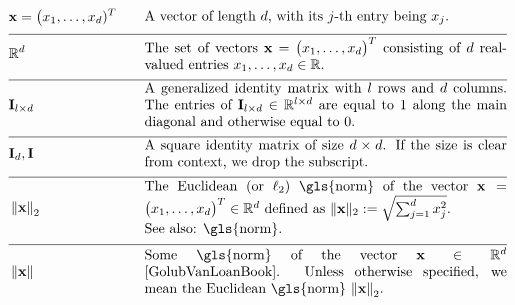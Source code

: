 \begin{align} 
	 &\featurevec=\big(\feature_{1}, \ldots, \feature_{\featuredim})^{T} &\quad & \parbox{.75\textwidth}{A vector of length $\featuredim$, with its 
		$\featureidx$-th entry being $\feature_{\featureidx}$.} \nonumber \\[2mm] \hline \nonumber\\[-5mm]
	&\mathbb{R}^{\featuredim} & \quad &  \parbox{.75\textwidth}{The set of vectors $\featurevec=\big(\feature_{1}, \ldots, \feature_{\featurelen}\big)^{T}$ consisting of 
		$\featuredim$ real-valued entries $\feature_{1}, \ldots, \feature_{\featurelen} \in \mathbb{R}$.} \nonumber \\[2mm] \hline \nonumber\\[-5mm]
	&\mathbf{I}_{\modelidx \times \featuredim}  & \quad &  \parbox{.75\textwidth}{A generalized identity matrix 
		with $\modelidx$ rows and $\featuredim$ columns. The entries of $\mathbf{I}_{\modelidx \times \featuredim} \in \mathbb{R}^{\modelidx \times \featuredim}$ 
		are equal to $1$ along the main diagonal and otherwise equal to $0$. }\nonumber \\[2mm] \hline \nonumber\\[-5mm] %
	&\mathbf{I}_{\dimlocalmodel}, \mathbf{I} & \quad &  \parbox{.75\textwidth}{A square identity 
		matrix of size $\dimlocalmodel \times \dimlocalmodel$. If the size is clear from 
		context, we drop the subscript.} \nonumber \\[2mm] \hline \nonumber\\[-5mm]
	&\normgeneric{\featurevec}{2}  &\quad & \parbox{.75\textwidth}{The Euclidean (or $\ell_{2}$) \gls{norm} of the vector 
		$\featurevec=\big(\feature_{1}, \ldots, \feature_{\featurelen}\big)^{T} \in \mathbb{R}^{\featuredim}$ defined as 
		$\| \featurevec \|_{2} \defeq \sqrt{\sum_{\featureidx=1}^{\featuredim} \feature_{\featureidx}^{2}}$.
		\\ See also: \gls{norm}. } \nonumber \\[2mm] \hline \nonumber\\[-5mm] 
	&\normgeneric{\featurevec}{}  & \quad &  \parbox{.75\textwidth}{Some \gls{norm} of the vector $\featurevec \in \mathbb{R}^{\featuredim}$ \cite{GolubVanLoanBook}. 
		Unless otherwise specified, we mean the Euclidean \gls{norm} $\normgeneric{\featurevec}{2}$.
}
\end{align}
